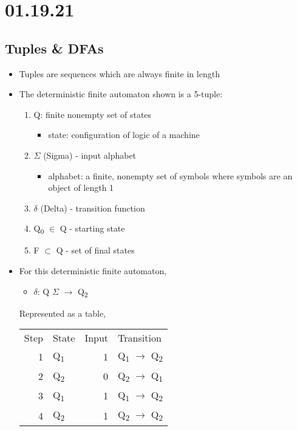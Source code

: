 \documentclass[11pt]{article}
\author{Sudhan Chitgopkar}
\date{\today}
\title{}
\begin{document}
\tableofcontents

\section{01.19.21}
\label{sec:org2250da2}
\subsection{Tuples \& DFAs}
\label{sec:org5696e1b}
\begin{itemize}
\item Tuples are sequences which are always finite in length
\item The deterministic finite automaton shown is a 5-tuple:
\begin{enumerate}
\item Q: finite nonempty set of states
\begin{itemize}
\item state: configuration of logic of a machine
\end{itemize}
\item \(\Sigma\) (Sigma) - input alphabet
\begin{itemize}
\item alphabet: a finite, nonempty set of symbols where symbols are an object of length 1
\end{itemize}
\item \(\delta\) (Delta) - transition function
\item Q\textsubscript{0} \(\in\) Q - starting state
\item F \(\subset\) Q - set of final states
\end{enumerate}
\item For this deterministic finite automaton,
\begin{itemize}
\item \(\delta\): Q \texttimes{} \(\Sigma\) \(\to\) Q\textsubscript{2}
\end{itemize}
Represented as a table,
\begin{center}
\begin{tabular}{rlrl}
Step & State & Input & Transition\\
1 & Q\textsubscript{1} & 1 & Q\textsubscript{1} \(\to\) Q\textsubscript{2}\\
2 & Q\textsubscript{2} & 0 & Q\textsubscript{2} \(\to\) Q\textsubscript{1}\\
3 & Q\textsubscript{1} & 1 & Q\textsubscript{1} \(\to\) Q\textsubscript{2}\\
4 & Q\textsubscript{2} & 1 & Q\textsubscript{2} \(\to\) Q\textsubscript{2}\\
\end{tabular}
\end{center}
\end{itemize}
\end{document}
